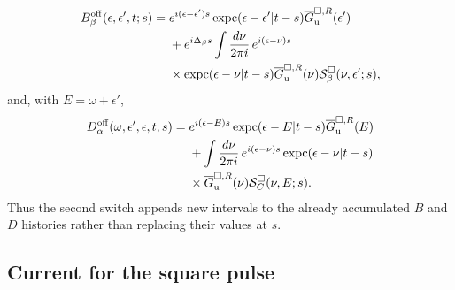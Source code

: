 \documentclass[
 reprint,
 superscriptaddress,
 amsmath,amssymb,
 aps,prb,
 longbibliography,
 floatfix
]{revtex4-2}
\newcommand{\expc}{\operatorname{expc}}
\begin{document}
\begin{equation*}
\begin{aligned}
B_\beta^{\rm off}
(\epsilon,\epsilon',t;s)
={}&
e^{i(\epsilon-\epsilon')s}
\expc(\epsilon-\epsilon'|t-s)
\overline G_{\mathrm u}^{\square,R}(\epsilon')
\\
&+
e^{i\Delta_\beta s}
\int\frac{d\nu}{2\pi i}\,
e^{i(\epsilon-\nu)s}
\\
&\times
\expc(\epsilon-\nu|t-s)
\overline G_{\mathrm u}^{\square,R}(\nu)
\mathcal S_\beta^\square
(\nu,\epsilon';s),
\end{aligned}
\end{equation*}
and, with $E=\omega+\epsilon'$,
\begin{equation*}
\begin{aligned}
D_\alpha^{\rm off}
(\omega,\epsilon',\epsilon,t;s)
={}&
e^{i(\epsilon-E)s}
\expc(\epsilon-E|t-s)
\overline G_{\mathrm u}^{\square,R}(E)
\\
&+
\int\frac{d\nu}{2\pi i}\,
e^{i(\epsilon-\nu)s}
\expc(\epsilon-\nu|t-s)
\\
&\times
\overline G_{\mathrm u}^{\square,R}(\nu)
\mathcal S_C^\square(\nu,E;s).
\end{aligned}
\end{equation*}
Thus the second switch appends new intervals to the already accumulated $B$ and $D$ histories rather than replacing their values at $s$.

\subsection{Current for the square pulse}
\label{sec:square-current}
\end{document}
